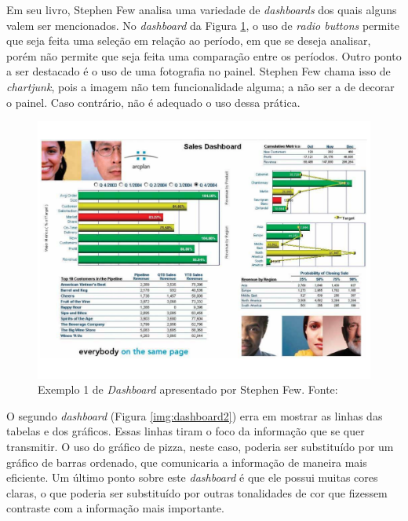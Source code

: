 Em seu livro, Stephen Few \cite{book_design} analisa uma variedade de \textit{dashboards} dos quais alguns valem ser mencionados. No \textit{dashboard} da Figura \ref{img:dashboard1}, o uso de \textit{radio buttons} permite que seja feita uma seleção em relação ao período, em que se deseja analisar, porém não permite que seja feita uma comparação entre os períodos. Outro ponto a ser destacado é o uso de uma fotografia no painel. Stephen Few chama isso de \textit{chartjunk}, pois a imagem não tem funcionalidade alguma; a não ser a de decorar o painel. Caso contrário, não é adequado o uso dessa prática. 
\graphicspath{{figuras/}}
\begin{figure}[H]
\centering
\includegraphics[scale=0.50]{dashboard1}
\caption{Exemplo 1 de \textit{Dashboard} apresentado por Stephen Few. Fonte: \cite{book_design}}
\label{img:dashboard1}
\end{figure}

O segundo \textit{dashboard} (Figura \ref{img:dashboard2}) erra em mostrar as linhas das tabelas e dos gráficos. Essas linhas tiram o foco da informação que se quer transmitir. O uso do gráfico de pizza, neste caso, poderia ser substituído por um gráfico de barras ordenado, que comunicaria a informação de maneira mais eficiente. Um último ponto sobre este \textit{dashboard} é que ele possui muitas cores claras, o que poderia ser substituído por outras tonalidades de cor que fizessem contraste com a informação mais importante.

